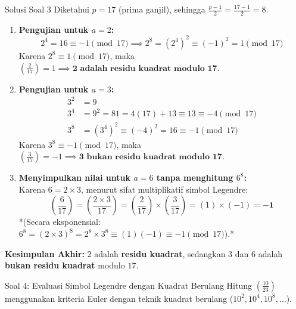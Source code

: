 \documentclass[11pt,a4paper]{article}
\begin{document}
\begin{solusibox}{Solusi Soal 3}
Diketahui $p = 17$ (prima ganjil), sehingga $\frac{p-1}{2} = \frac{17-1}{2} = 8$.

\begin{enumerate}[leftmargin=*]
    \item \textbf{Pengujian untuk $a = 2$:}
    \[
    2^4 = 16 \equiv -1 \pmod{17} \implies 2^8 = (2^4)^2 \equiv (-1)^2 = 1 \pmod{17}
    \]
    Karena $2^8 \equiv 1 \pmod{17}$, maka $\left(\frac{2}{17}\right) = 1 \implies \mathbf{2 \text{ adalah residu kuadrat modulo } 17.}$

    \item \textbf{Pengujian untuk $a = 3$:}
    \begin{align*}
    3^2 &= 9 \\
    3^4 &= 9^2 = 81 = 4(17) + 13 \equiv 13 \equiv -4 \pmod{17} \\
    3^8 &= (3^4)^2 \equiv (-4)^2 = 16 \equiv -1 \pmod{17}
    \end{align*}
    Karena $3^8 \equiv -1 \pmod{17}$, maka $\left(\frac{3}{17}\right) = -1 \implies \mathbf{3 \text{ bukan residu kuadrat modulo } 17.}$

    \item \textbf{Menyimpulkan nilai untuk $a = 6$ tanpa menghitung $6^8$:} \\
    Karena $6 = 2 \times 3$, menurut sifat multiplikatif simbol Legendre:
    \[
    \left(\frac{6}{17}\right) = \left(\frac{2 \times 3}{17}\right) = \left(\frac{2}{17}\right) \times \left(\frac{3}{17}\right) = (1) \times (-1) = \mathbf{-1}
    \]
    *(Secara eksponensial: $6^8 = (2 \times 3)^8 = 2^8 \times 3^8 \equiv (1)(-1) \equiv -1 \pmod{17}$).*
\end{enumerate}

\textbf{Kesimpulan Akhir:} $2$ adalah \textbf{residu kuadrat}, sedangkan $3$ dan $6$ adalah \textbf{bukan residu kuadrat} modulo $17$.
\end{solusibox}

\newpage

\begin{soalbox}{Soal 4: Evaluasi Simbol Legendre dengan Kuadrat Berulang}
Hitung $\left(\frac{10}{23}\right)$ menggunakan kriteria Euler dengan teknik kuadrat berulang ($10^2, 10^4, 10^8, \ldots$).
\end{soalbox}
\end{document}
